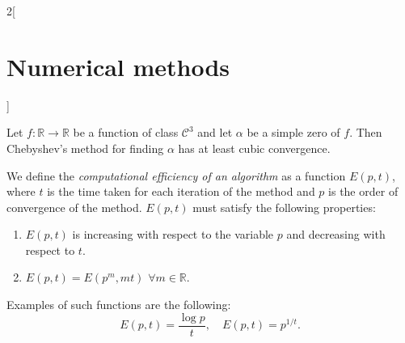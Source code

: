 \documentclass[../../../main.tex]{subfiles}
\begin{document}
\begin{multicols}{2}[\section{Numerical methods}]
\begin{theorem}
\end{theorem}
\begin{theorem}
Let $f:\mathbb{R}\rightarrow\mathbb{R}$ be a function of class $\mathcal{C}^3$ and let $\alpha$ be a simple zero of $f$. Then Chebyshev's method for finding $\alpha$ has at least cubic convergence.
\end{theorem}
\begin{definition}
We define the \textit{computational efficiency of an algorithm} as a function $E(p,t)$, where $t$ is the time taken for each iteration of the method and $p$ is the order of convergence of the method. $E(p,t)$ must satisfy the following properties:
\begin{enumerate}
    \item $E(p,t)$ is increasing with respect to the variable $p$ and decreasing with respect to $t$.
    \item $E(p,t)=E(p^m,mt)$ $\forall m\in\mathbb{R}$.
\end{enumerate}
Examples of such functions are the following: $$E(p,t)=\frac{\log p}{t},\quad E(p,t)=p^{1/t}.$$
\end{definition}

\end{multicols}
\end{document}
